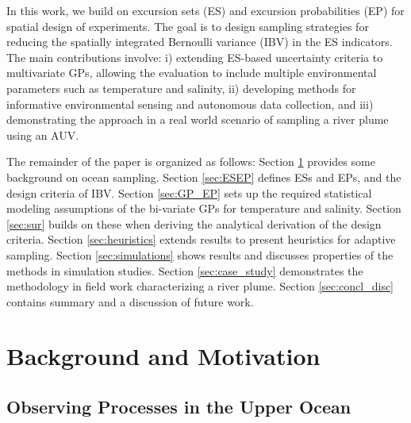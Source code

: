 \documentclass[aoas]{imsart}
\begin{document}

In this work, we build on excursion sets (ES) and excursion probabilities (EP) for spatial design of experiments. The goal is to design sampling strategies for reducing the spatially integrated Bernoulli variance (IBV) in the ES indicators.  The main contributions involve: i) extending ES-based uncertainty criteria to multivariate GPs, allowing the evaluation to include multiple environmental parameters such as temperature and salinity, ii) developing methods for informative environmental sensing and autonomous data collection, and iii) demonstrating the approach in a real world scenario of sampling a river plume using an AUV. 

The remainder of the paper is organized as follows: Section \ref{sec:bg} provides some background on ocean sampling. Section \ref{sec:ESEP} defines ESs and EPs, and the design criteria of IBV. Section \ref{sec:GP_EP} sets up the required statistical modeling assumptions of the bi-variate GPs for temperature and salinity. Section \ref{sec:sur} builds on these when deriving the analytical derivation of the design criteria. Section \ref{sec:heuristics} extends results to present heuristics for adaptive sampling. Section \ref{sec:simulations} shows results and discusses properties of the methods in simulation studies. Section \ref{sec:case_study} demonstrates the methodology in field work characterizing a river plume.  Section \ref{sec:concl_disc} contains summary and a discussion of future work. 


\section{Background and Motivation}\label{sec:bg}


\subsection{Observing Processes in the Upper Ocean}

\end{document}
